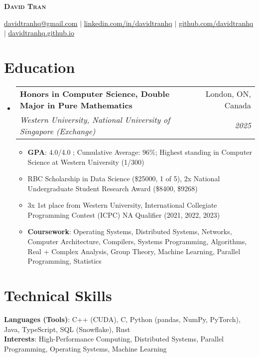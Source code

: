 \documentclass[letterpaper,10pt]{article}
\makeatletter
\newcommand{\resumeItem}[1]{
  \item\small{
    {#1 \vspace{-2pt}}
  }
}
\newcommand{\resumeSubheading}[4]{
  \vspace{-2pt}\item
    \begin{tabular*}{0.97\textwidth}[t]{l@{\extracolsep{\fill}}r}
      \textbf{#1} & #2 \\
      \textit{\small#3} & \textit{\small #4} \\
    \end{tabular*}\vspace{-7pt}
}
\newcommand{\resumeSubHeadingListStart}{\begin{itemize}[leftmargin=0.15in, label={}]}
\newcommand{\resumeSubHeadingListEnd}{\end{itemize}}
\newcommand{\resumeItemListStart}{\begin{itemize}}
\newcommand{\resumeItemListEnd}{\end{itemize}\vspace{-5pt}}
\makeatother
\begin{document}

\begin{center}
    \textbf{\Huge \scshape David Tran} \\ \vspace{1pt}

    \href{mailto:davidtranhq@gmail.com}{\underline{davidtranhq@gmail.com}} $|$
    \href{https://www.linkedin.com/in/davidtranhq}{\underline{linkedin.com/in/davidtranhq}} $|$
    \href{https://github.com/davidtranhq}{\underline{github.com/davidtranhq}} $|$
    \href{https://davidtranhq.github.io}{\underline{davidtranhq.github.io}}
\end{center}


\section{Education}
\resumeSubHeadingListStart
  \resumeSubheading
    {Honors in Computer Science, Double Major in Pure Mathematics}{London, ON, Canada}
    {Western University, National University of Singapore (Exchange)}{2025}
    \resumeItemListStart
      \resumeItem{\textbf{GPA}: 4.0/4.0 ; Cumulative Average: 96\%; Highest standing in Computer Science at Western University (1/300)}
      \resumeItem{RBC Scholarship in Data Science (\$25000, 1 of 5), 2x National Undergraduate Student Research Award (\$8400, \$9268)}
      \resumeItem{3x 1st place from Western University, International Collegiate Programming Contest (ICPC) NA Qualifier (2021, 2022, 2023)}
      \resumeItem{\textbf{Coursework}{: Operating Systems, Distributed Systems, Networks, Computer Architecture, Compilers, Systems Programming, Algorithms, Real + Complex Analysis, Group Theory, Machine Learning, Parallel Programming, Statistics  }}

      \resumeItemListEnd
    \resumeSubHeadingListEnd

    \section{Technical Skills}
    \begin{itemize}[leftmargin=0.15in, label={}]
       \small{\item{
        \textbf{Languages (Tools)}{: C++ (CUDA), C, Python (pandas, NumPy, PyTorch), Java, TypeScript, SQL (Snowflake), Rust} \\
        \textbf{Interests}{: High-Performance Computing, Distributed Systems, Parallel Programming, Operating Systems, Machine Learning  }}} \\
    \end{itemize}
%
\end{document}
